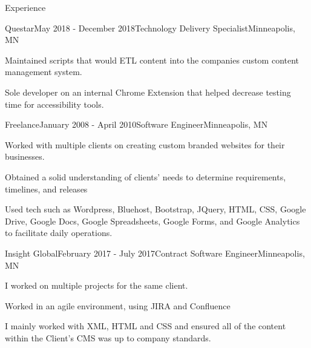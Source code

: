 \documentclass[
	12pt, %
]{resume} %
\begin{document}
\begin{rSection}{Experience}

	\begin{rSubsection}{Questar}{May 2018 - December 2018}{Technology Delivery Specialist}{Minneapolis, MN}
		\item Maintained scripts that would ETL content into the companies custom content management system.
		\item Sole developer on an internal Chrome Extension that helped decrease testing time for accessibility tools.
	\end{rSubsection}


\begin{rSubsection}{Freelance}{January 2008 - April 2010}{Software Engineer}{Minneapolis, MN}
	\item Worked with multiple clients on creating custom branded websites for their businesses.
	\item Obtained a solid understanding of clients' needs to determine requirements, timelines, and releases
	\item Used tech such as Wordpress, Bluehost, Bootstrap, JQuery, HTML, CSS, Google Drive, Google Docs, Google Spreadsheets, Google Forms, and Google Analytics to facilitate daily operations.
\end{rSubsection}


	\begin{rSubsection}{Insight Global}{February 2017 - July 2017}{Contract Software Engineer}{Minneapolis, MN}
		\item I worked on multiple projects for the same client.
		\item Worked in an agile environment, using JIRA and Confluence
		\item I mainly worked with XML, HTML and CSS and ensured all of the content within the Client's CMS was up to company standards.
	\end{rSubsection}

\end{rSection}

\end{document}
